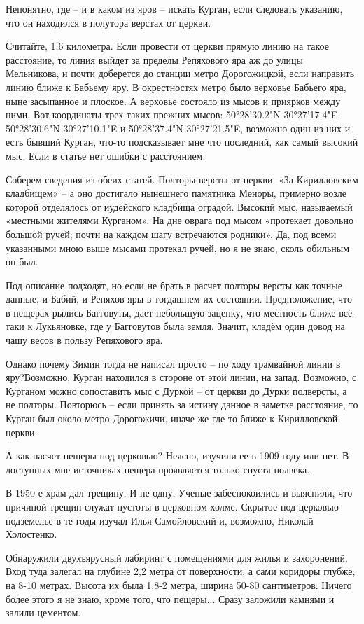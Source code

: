 Непонятно, где – и в каком из яров – искать Курган, если следовать указанию, что он находился в полутора верстах от церкви.

Считайте, 1,6 километра. Если провести от церкви прямую линию на такое расстояние, то линия выйдет за пределы Репяхового яра аж до улицы Мельникова, и почти доберется до станции метро Дорогожицкой, если направить линию ближе к Бабьему яру. В окрестностях метро было верховье Бабьего яра, ныне засыпанное и плоское. А верховье состояло из мысов и приярков между ними. Вот координаты трех таких прежних мысов: 50°28'30.2"N 30°27'17.4"E, 50°28'30.6"N 30°27'10.1"E и 50°28'37.4"N 30°27'21.5"E, возможно один из них и есть бывший Курган, что-то подсказывает мне что последний, как самый высокий мыс. Если в статье нет ошибки с расстоянием.

Соберем сведения из обеих статей. Полторы версты от церкви. «За Кирилловским кладбищем» – а оно достигало нынешнего памятника Меноры, примерно возле которой отделялось от иудейского кладбища оградой. Высокий мыс, называемый «местными жителями Курганом». На дне оврага под мысом «протекает довольно большой ручей; почти на каждом шагу встречаются родники». Да, под всеми указанными мною выше мысами протекал ручей, но я не знаю, сколь обильным он был.

Под описание подходят, но если не брать в расчет полторы версты как точные данные, и Бабий, и Репяхов яры в тогдашнем их состоянии. Предположение, что в пещерах рылись Багговуты, дает небольшую зацепку, что местность ближе всё-таки к Лукьяновке, где у Багговутов была земля. Значит, кладём один довод на чашу весов в пользу Репяхового яра. 

Однако почему Зимин тогда не написал просто – по ходу трамвайной линии в яру?Возможно, Курган находился в стороне от этой линии, на запад. Возможно, с Курганом можно сопоставить мыс с Дуркой – от церкви до Дурки полверсты, а не полторы. Повторюсь – если принять за истину данное в заметке расстояние, то Курган был около метро Дорогожичи, иначе же где-то ближе к Кирилловской церкви.

А как насчет пещеры под церковью? Неясно, изучили ее в 1909 году или нет. В доступных мне источниках пещера проявляется только спустя полвека.

В 1950-е храм дал трещину. И не одну. Ученые забеспокоились и выяснили, что причиной трещин служат пустоты в церковном холме. Скрытое под церковью подземелье в те годы изучал Илья Самойловский и, возможно, Николай Холостенко. 

Обнаружили двухъярусный лабиринт с помещениями для жилья и захоронений. Вход туда залегал на глубине 2,2 метра от поверхности, а сами коридоры глубже, на 8-10 метрах. Высота их была 1,8-2 метра, ширина 50-80 сантиметров. Ничего более этого я не знаю, кроме того, что пещеры... Сразу заложили камнями и залили цементом.

